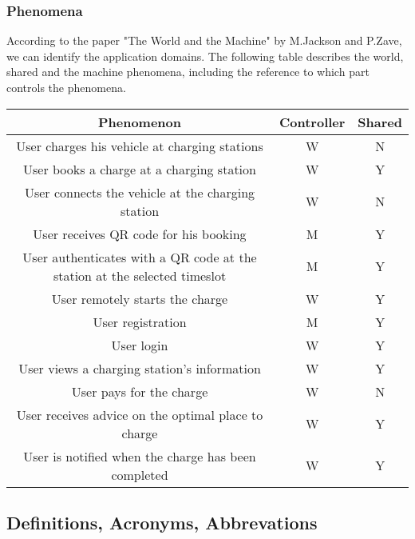 \subsubsection{Phenomena}
According to the paper "The World and the Machine" by M.Jackson and P.Zave, 
we can identify the application domains. 
The following table describes the world, shared and the machine phenomena, 
including the reference to which part controls the phenomena.
\begin{table}[h]
        \centering
        \begin{tabular}{|c|c|c|}
        \hline
        \textbf{Phenomenon}                                        & \textbf{Controller} & \textbf{Shared} \\ \hline
        User charges his vehicle at charging stations  & W          & N      \\ \hline
        User books a charge at a charging station         & W          & Y      \\ \hline
        User connects the vehicle at the charging station              & W          & N      \\ \hline
        User receives QR code for his booking      & M          & Y      \\ \hline
        User authenticates with a QR code at the station at the selected timeslot      & M          & Y      \\ \hline
        User remotely starts the charge                   & W          & Y      \\ \hline       
        User registration                                 & M          & Y      \\ \hline
        User login                                        & W          & Y      \\ \hline
        User views a charging station's information       & W          & Y      \\ \hline
        User pays for the charge                          & W          & N      \\ \hline
        User receives advice on the optimal place to charge            & W          & Y      \\ \hline
        User is notified when the charge has been completed   & W          & Y      \\ \hline
       \end{tabular}
\end{table}

\subsection{Definitions, Acronyms, Abbrevations}
